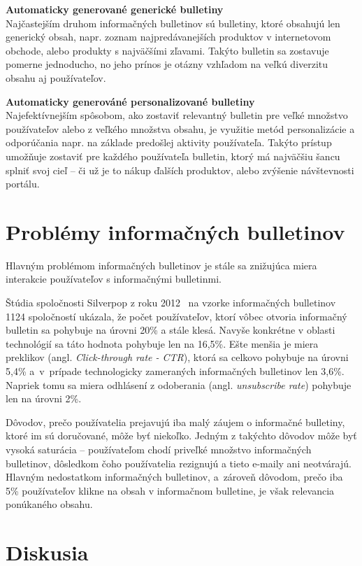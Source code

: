\textbf{Automaticky generované generické bulletiny}\\
Najčastejším druhom informačných bulletinov sú bulletiny, ktoré obsahujú len generický obsah, napr. zoznam najpredávanejších
produktov v internetovom obchode, alebo produkty s najväčšími zľavami. Takýto bulletin sa zostavuje pomerne jednoducho,
no jeho prínos je otázny vzhľadom na veľkú diverzitu obsahu aj používateľov.

\textbf{Automaticky generováné personalizované bulletiny}\\
Najefektívnejším spôsobom, ako zostaviť relevantný bulletin pre veľké množstvo používateľov alebo z veľkého množstva obsahu,
je využitie metód personalizácie a odporúčania napr. na základe predošlej aktivity používateľa. Takýto prístup umožňuje
zostaviť pre každého používateľa bulletin, ktorý má najväčšiu šancu splniť svoj cieľ -- či už je to nákup ďalších produktov,
alebo zvýšenie návštevnosti portálu.


\section{Problémy informačných bulletinov}
Hlavným problémom informačných bulletinov je stále sa znižujúca miera interakcie používateľov
s informačnými bulletinmi.

Štúdia spoločnosti Silverpop z roku 2012~\cite{mailmarketing} na vzorke informačných bulletinov 1124 spoločností ukázala,
že počet používateľov, ktorí vôbec otvoria informačný bulletin sa pohybuje na úrovni 20\% a stále klesá. Navyše konkrétne
v oblasti technológií sa táto hodnota pohybuje len na 16,5\%. Ešte menšia je miera preklikov
(angl. \emph{Click-through rate - CTR}), ktorá sa celkovo pohybuje na úrovni 5,4\% a~v~prípade technologicky zameraných
informačných bulletinov len 3,6\%. Napriek tomu sa miera odhlásení z odoberania (angl. \emph{unsubscribe rate}) pohybuje
len na úrovni 2\%.

Dôvodov, prečo používatelia prejavujú iba malý záujem o informačné bulletiny, ktoré im sú doručované, môže byť niekoľko.
Jedným z takýchto dôvodov môže byť vysoká saturácia -- používateľom chodí priveľké množstvo informačných bulletinov,
dôsledkom čoho používatelia rezignujú a tieto e-maily ani neotvárajú.
Hlavným nedostatkom informačných bulletinov, a~zároveň dôvodom, prečo iba 5\% používateľov klikne na obsah v informačnom
bulletine, je však relevancia ponúkaného obsahu.


\section{Diskusia}

